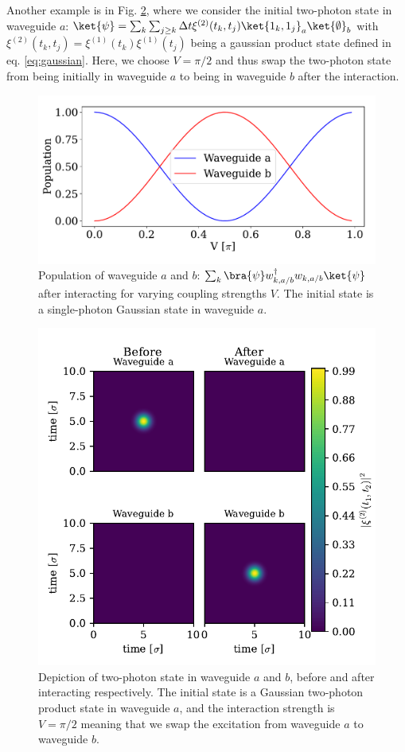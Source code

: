 Another example is in Fig. \ref{fig:swapping_twophoton}, where we consider the initial two-photon state in waveguide $a$: $\ket{\psi} = \sum_k \sum_{j \geq k} \Delta t \xi^{(2)}(t_k,t_j) \ket{1_k,1_j}_a\ket{\emptyset}_b$ with $\xi^{(2)}(t_k,t_j) = \xi^{(1)}(t_k)\xi^{(1)}(t_j)$ being a gaussian product state defined in eq. \eqref{eq:gaussian}. Here, we choose $V=\pi/2$ and thus swap the two-photon state from being initially in waveguide $a$ to being in waveguide $b$ after the interaction. 


\begin{figure}
    \centering
    \includegraphics[width=0.6 \linewidth]{figures/beamsplitter_trans.pdf}
    \caption{Population of waveguide $a$ and $b$: $\sum_k \bra{\psi} w_{k,a/b}^\dagger w_{k,a/b} \ket{\psi}$ after interacting for varying coupling strengths $V$. The initial state is a single-photon Gaussian state in waveguide $a$.}
    \label{fig:beamsplitter_trans}
\end{figure}


\begin{figure}[H]
    \centering
    \includegraphics[width=0.6 \linewidth]{figures/swapping_twophoton.pdf}
    \caption{Depiction of two-photon state in waveguide $a$ and $b$, before and after interacting respectively. The initial state is a Gaussian two-photon product state in waveguide $a$, and the interaction strength is $V=\pi/2$ meaning that we swap the excitation from waveguide $a$ to waveguide $b$.}
    \label{fig:swapping_twophoton}
\end{figure}



















